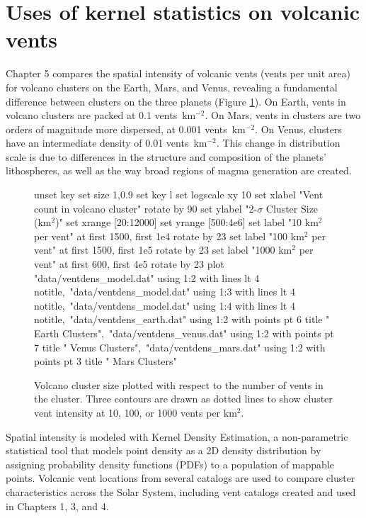 \section{Uses of kernel statistics on volcanic vents}


Chapter 5 compares the spatial intensity of volcanic vents (vents per unit area) for volcano clusters on the Earth, Mars, and Venus, revealing a fundamental difference between clusters on the three planets (Figure \ref{fig_ventdens}). On Earth, vents in volcano clusters are packed at 0.1 vents~km$^{-2}$. On Mars, vents in clusters are two orders of magnitude more dispersed, at 0.001 vents~km$^{-2}$. On Venus, clusters have an intermediate density of 0.01 vents~km$^{-2}$. This change in distribution scale is due to differences in the structure and composition of the planets' lithospheres, as well as the way broad regions of magma generation are created.


\begin{figure}[h!]
	\centering
	\begin{gnuplot}[terminal=latex, terminaloptions=rotate]
		unset key
		set size 1,0.9
		set key l
		set logscale xy 10
		set xlabel "Vent count in volcano cluster" rotate by 90
		set ylabel "2-$\sigma$ Cluster Size (km$^2$)"
		set xrange [20:12000]
		set yrange [500:4e6]
		set label "10 km$^2$ per vent" at first 1500, first 1e4 rotate by 23
		set label "100 km$^2$ per vent" at first 1500, first 1e5 rotate by 23
		set label "1000 km$^2$ per vent" at first 600, first 4e5 rotate by 23
		plot "data/ventdens_model.dat" using 1:2 with lines lt 4 notitle,\
		"data/ventdens_model.dat" using 1:3 with lines lt 4 notitle,\
		"data/ventdens_model.dat" using 1:4 with lines lt 4 notitle,\
		"data/ventdens_earth.dat" using 1:2 with points pt 6 title "  Earth Clusters",\
		"data/ventdens_venus.dat" using 1:2 with points pt 7 title "  Venus Clusters",\
		"data/ventdens_mars.dat" using 1:2 with points pt 3 title "  Mars Clusters"
	\end{gnuplot}
	\caption{Volcano cluster size plotted with respect to the number of vents in the cluster. Three contours are drawn as dotted lines to show cluster vent intensity at 10, 100, or 1000 vents per km$^2$.}
	\label{fig_ventdens}
\end{figure}


Spatial intensity is modeled with Kernel Density Estimation, a non-parametric statistical tool that models point density as a 2D density distribution by assigning probability density functions (PDFs) to a population of mappable points. Volcanic vent locations from several catalogs are used to compare cluster characteristics across the Solar System, including vent catalogs created and used in Chapters 1, 3, and 4.

